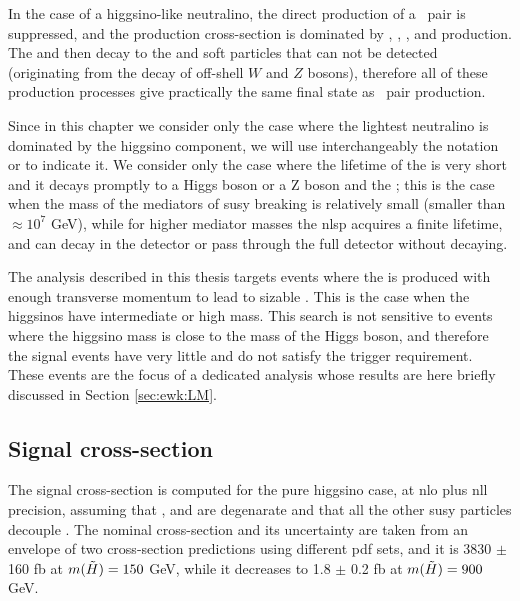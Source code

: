 In the case of a higgsino-like neutralino, the direct production of a \ninoone\ninoone\ pair is suppressed, and the production cross-section is dominated by 
\ninoone\ninotwo, \ninoone\chinoonepm, \ninotwo\chinoonepm, and \chinoonep\chinoonem production.
The \ninotwo and \chinoonepm then decay to the \ninoone and soft particles that can not be detected (originating from the 
decay of off-shell $W$ and $Z$ bosons), therefore all of these production processes give practically the same final state as 
\ninoone\ninoone\  pair production. 

Since in this chapter we consider only the case where the lightest neutralino is dominated by the higgsino component,
we will use interchangeably the notation \ninoone or \hino to indicate it.  
We consider only the case where the lifetime of the \hino is very short and it decays promptly to a Higgs boson or a Z boson and the \gravino;
this is the case when the mass of the mediators of \gls{susy} breaking is relatively small (smaller than $\approx 10^7$ GeV), 
while for higher mediator masses the \gls{nlsp} acquires a finite lifetime, and can decay in the detector or pass
 through the full detector without decaying. 

The analysis described in this thesis targets events where the \gravino is produced with enough transverse momentum to lead to 
sizable \met. This is the case when the higgsinos have intermediate or high mass.
This search is not sensitive to events where the higgsino mass is close to the mass of the Higgs boson, and therefore 
the signal events have very little \met and do not satisfy the \met trigger requirement.
These events are the focus of a dedicated analysis whose results are here briefly discussed in Section \ref{sec:ewk:LM}.


\subsection{Signal cross-section}

The signal cross-section is computed for the pure higgsino case, at \gls{nlo} plus \gls{nll} precision, assuming that
\ninoone, \ninotwo and \chinoonepm are degenarate and that all the other \gls{susy} particles decouple \cite{Fuks:2012qx,Fuks:2013vua}.
The nominal cross-section and its uncertainty are taken from an envelope of two cross-section predictions using different \gls{pdf} sets, 
and it is 3830 $\pm$ 160 fb at $m(\tilde{H}) = 150$ GeV, while it decreases to 1.8 $\pm$ 0.2 fb at $m(\tilde{H}) = 900$ GeV. 

